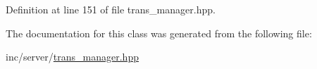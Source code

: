 Definition at line 151 of file trans\+\_\+manager.\+hpp.



The documentation for this class was generated from the following file\+:\begin{DoxyCompactItemize}
\item 
inc/server/\hyperlink{server_2trans__manager_8hpp}{trans\+\_\+manager.\+hpp}\end{DoxyCompactItemize}
